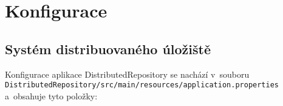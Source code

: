


\chapter{Konfigurace} \label{configuration}
\section{Systém distribuovaného úložiště}
Konfigurace aplikace DistributedRepository se nachází v~souboru \\ \texttt{DistributedRepository/src/main/resources/application.properties} \\
a~obsahuje tyto položky:

